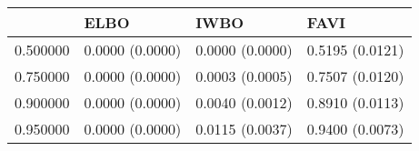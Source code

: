 \begin{tabular}{llll}
\toprule
 & ELBO & IWBO & FAVI \\
\midrule
0.500000 & 0.0000 (0.0000) & 0.0000 (0.0000) & 0.5195 (0.0121) \\
0.750000 & 0.0000 (0.0000) & 0.0003 (0.0005) & 0.7507 (0.0120) \\
0.900000 & 0.0000 (0.0000) & 0.0040 (0.0012) & 0.8910 (0.0113) \\
0.950000 & 0.0000 (0.0000) & 0.0115 (0.0037) & 0.9400 (0.0073) \\
\bottomrule
\end{tabular}
